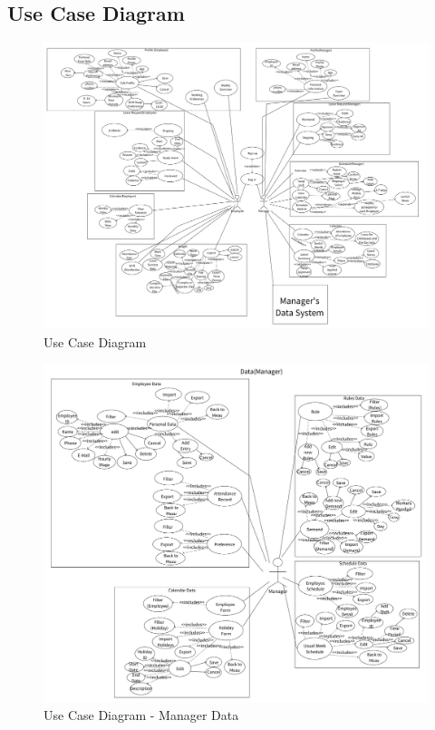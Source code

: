 \documentclass[a4paper,12pt, oneside]{report}
\begin{document}
\subsection{Use Case Diagram}
\begin{figure}[H]
    \centering
    \includegraphics[width=\linewidth]{UMLDiagrams/UseCase1.png}
    \caption{Use Case Diagram}
    \label{fig:use-case-1}
\end{figure}

\begin{figure}[H]
    \centering
    \includegraphics[width=\linewidth]{UMLDiagrams/UseCase2.png}
    \caption{Use Case Diagram - Manager Data}
    \label{fig:use-case-2}
\end{figure}
\end{document}
